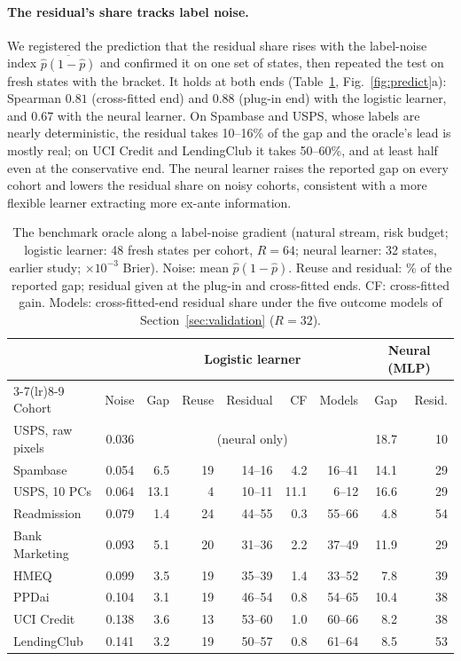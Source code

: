 \documentclass[runningheads]{llncs}
\begin{document}
\paragraph{The residual's share tracks label noise.} We registered the prediction that the residual share rises with the label-noise index $\overline{\hat p(1-\hat p)}$ and confirmed it on one set of states, then repeated the test on fresh states with the bracket. It holds at both ends (Table~\ref{tab:gradient}, Fig.~\ref{fig:predict}a): Spearman $0.81$ (cross-fitted end) and $0.88$ (plug-in end) with the logistic learner, and $0.67$ with the neural learner. On Spambase and USPS, whose labels are nearly deterministic, the residual takes 10--16\% of the gap and the oracle's lead is mostly real; on UCI Credit and LendingClub it takes 50--60\%, and at least half even at the conservative end. The neural learner raises the reported gap on every cohort and lowers the residual share on noisy cohorts, consistent with a more flexible learner extracting more ex-ante information.

\begin{table}[t]
\caption{The benchmark oracle along a label-noise gradient (natural stream, risk budget; logistic learner: 48 fresh states per cohort, $R=64$; neural learner: 32 states, earlier study; $\times10^{-3}$ Brier). Noise: mean $\hat p(1-\hat p)$. Reuse and residual: \% of the reported gap; residual given at the plug-in and cross-fitted ends. CF: cross-fitted gain. Models: cross-fitted-end residual share under the five outcome models of Section~\ref{sec:validation} ($R=32$).}
\label{tab:gradient}
\centering\scriptsize
\setlength{\tabcolsep}{2.8pt}
\begin{tabular}{lrrrrrrrr}
\toprule
& & \multicolumn{5}{c}{Logistic learner} & \multicolumn{2}{c}{Neural (MLP)} \\
\cmidrule(lr){3-7}\cmidrule(lr){8-9}
Cohort & Noise & Gap & Reuse & Residual & CF & Models & Gap & Resid. \\
\midrule
USPS, raw pixels & 0.036 & \multicolumn{5}{c}{(neural only)} & 18.7 & 10 \\
Spambase & 0.054 & 6.5 & 19 & 14--16 & 4.2 & 16--41 & 14.1 & 29 \\
USPS, 10 PCs & 0.064 & 13.1 & 4 & 10--11 & 11.1 & 6--12 & 16.6 & 29 \\
Readmission & 0.079 & 1.4 & 24 & 44--55 & 0.3 & 55--66 & 4.8 & 54 \\
Bank Marketing & 0.093 & 5.1 & 20 & 31--36 & 2.2 & 37--49 & 11.9 & 29 \\
HMEQ & 0.099 & 3.5 & 19 & 35--39 & 1.4 & 33--52 & 7.8 & 39 \\
PPDai & 0.104 & 3.1 & 19 & 46--54 & 0.8 & 54--65 & 10.4 & 38 \\
UCI Credit & 0.138 & 3.6 & 13 & 53--60 & 1.0 & 60--66 & 8.2 & 38 \\
LendingClub & 0.141 & 3.2 & 19 & 50--57 & 0.8 & 61--64 & 8.5 & 53 \\
\bottomrule
\end{tabular}
\end{table}
\end{document}
